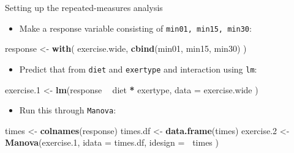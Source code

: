 \documentclass[ignorenonframetext,]{beamer}
\newenvironment{Shaded}{\begin{snugshade}}{\end{snugshade}}
\newcommand{\DataTypeTok}[1]{\textcolor[rgb]{0.13,0.29,0.53}{#1}}
\newcommand{\FloatTok}[1]{\textcolor[rgb]{0.00,0.00,0.81}{#1}}
\newcommand{\KeywordTok}[1]{\textcolor[rgb]{0.13,0.29,0.53}{\textbf{#1}}}
\newcommand{\NormalTok}[1]{#1}
\newcommand{\OperatorTok}[1]{\textcolor[rgb]{0.81,0.36,0.00}{\textbf{#1}}}
\newcommand{\StringTok}[1]{\textcolor[rgb]{0.31,0.60,0.02}{#1}}
\providecommand{\tightlist}{%
  \setlength{\itemsep}{0pt}\setlength{\parskip}{0pt}}
\begin{document}
\begin{frame}[fragile]{Setting up the repeated-measures analysis}
\protect\hypertarget{setting-up-the-repeated-measures-analysis}{}

\begin{itemize}
\tightlist
\item
  Make a response variable consisting of \texttt{min01,\ min15,\ min30}:
\end{itemize}

\begin{Shaded}
\begin{Highlighting}[]
\NormalTok{response <-}\StringTok{ }\KeywordTok{with}\NormalTok{(}
\NormalTok{  exercise.wide,}
  \KeywordTok{cbind}\NormalTok{(min01, min15, min30)}
\NormalTok{)}
\end{Highlighting}
\end{Shaded}

\begin{itemize}
\tightlist
\item
  Predict that from \texttt{diet} and \texttt{exertype} and interaction
  using \texttt{lm}:
\end{itemize}

\begin{Shaded}
\begin{Highlighting}[]
\NormalTok{exercise}\FloatTok{.1}\NormalTok{ <-}\StringTok{ }\KeywordTok{lm}\NormalTok{(response }\OperatorTok{~}\StringTok{ }\NormalTok{diet }\OperatorTok{*}\StringTok{ }\NormalTok{exertype,}
  \DataTypeTok{data =}\NormalTok{ exercise.wide}
\NormalTok{)}
\end{Highlighting}
\end{Shaded}

\begin{itemize}
\tightlist
\item
  Run this through \texttt{Manova}:
\end{itemize}

\begin{Shaded}
\begin{Highlighting}[]
\NormalTok{times <-}\StringTok{ }\KeywordTok{colnames}\NormalTok{(response)}
\NormalTok{times.df <-}\StringTok{ }\KeywordTok{data.frame}\NormalTok{(times)}
\NormalTok{exercise}\FloatTok{.2}\NormalTok{ <-}\StringTok{ }\KeywordTok{Manova}\NormalTok{(exercise}\FloatTok{.1}\NormalTok{,}
  \DataTypeTok{idata =}\NormalTok{ times.df,}
  \DataTypeTok{idesign =} \OperatorTok{~}\NormalTok{times}
\NormalTok{)}
\end{Highlighting}
\end{Shaded}

\end{frame}
\end{document}
